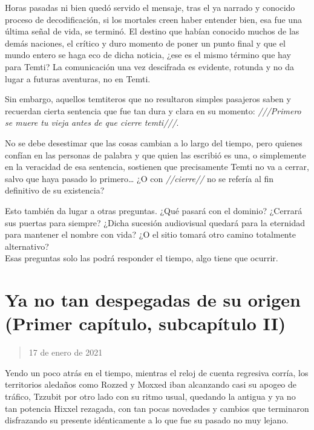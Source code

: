 \documentclass[
  spanish,
]{book}
\begin{document}
Horas pasadas ni bien quedó servido el mensaje, tras el ya narrado y conocido proceso de decodificación, si los mortales creen haber entender bien, esa fue una última señal de vida, se terminó. El destino que habían conocido muchos de las demás naciones, el crítico y duro momento de poner un punto final y que el mundo entero se haga eco de dicha noticia, ¿ese es el mismo término que hay para Temti? La comunicación una vez descifrada es evidente, rotunda y no da lugar a futuras aventuras, no en Temti.

Sin embargo, aquellos temtiteros que no resultaron simples pasajeros saben y recuerdan cierta sentencia que fue tan dura y clara en su momento: \emph{///Primero se muere tu vieja antes de que cierre temti///}.

No se debe desestimar que las cosas cambian a lo largo del tiempo, pero quienes confían en las personas de palabra y que quien las escribió es una, o simplemente en la veracidad de esa sentencia, sostienen que precisamente Temti no va a cerrar, salvo que haya pasado lo primero\ldots{} ¿O con \emph{//cierre//} no se refería al fin definitivo de su existencia?

Esto también da lugar a otras preguntas. ¿Qué pasará con el dominio? ¿Cerrará sus puertas para siempre? ¿Dicha sucesión audiovisual quedará para la eternidad para mantener el nombre con vida? ¿O el sitio tomará otro camino totalmente alternativo?\\
Esas preguntas solo las podrá responder el tiempo, algo tiene que ocurrir.

\hypertarget{ya-no-tan-despegadas-de-su-origen-primer-capuxedtulo-subcapuxedtulo-ii}{%
\section{Ya no tan despegadas de su origen (Primer capítulo, subcapítulo II)}\label{ya-no-tan-despegadas-de-su-origen-primer-capuxedtulo-subcapuxedtulo-ii}}

\begin{quote}
17 de enero de 2021
\end{quote}

Yendo un poco atrás en el tiempo, mientras el reloj de cuenta regresiva corría, los territorios aledaños como Rozzed y Moxxed iban alcanzando casi su apogeo de tráfico, Tzzubit por otro lado con su ritmo usual, quedando la antigua y ya no tan potencia Hixxel rezagada, con tan pocas novedades y cambios que terminaron disfrazando su presente idénticamente a lo que fue su pasado no muy lejano.
\end{document}
